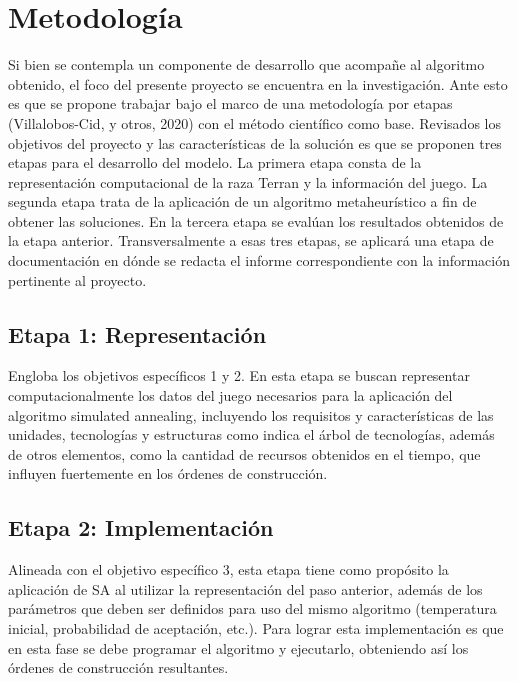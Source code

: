 
\section{Metodología}
Si bien se contempla un componente de desarrollo que acompañe al algoritmo obtenido, el foco del presente proyecto se encuentra en la investigación. Ante esto es que se propone trabajar bajo el marco de una metodología por etapas (Villalobos-Cid, y otros, 2020) con el método científico como base. Revisados los objetivos del proyecto y las características de la solución es que se proponen tres etapas para el desarrollo del modelo. La primera etapa consta de la representación computacional de la raza Terran y la información del juego. La segunda etapa trata de la aplicación de un algoritmo metaheurístico a fin de obtener las soluciones. En la tercera etapa se evalúan los resultados obtenidos de la etapa anterior. Transversalmente a esas tres etapas, se aplicará una etapa de documentación en dónde se redacta el informe correspondiente con la información pertinente al proyecto.

\subsection{Etapa 1: Representaci\'on}

Engloba los objetivos específicos 1 y 2. En esta etapa se buscan representar computacionalmente los datos del juego necesarios para la aplicación del algoritmo simulated annealing, incluyendo los requisitos y características de las unidades, tecnologías y estructuras como indica el árbol de tecnologías, además de otros elementos, como la cantidad de recursos obtenidos en el tiempo, que influyen fuertemente en los órdenes de construcción.

\subsection{Etapa 2: Implementaci\'on}

Alineada con el objetivo específico 3, esta etapa tiene como propósito la aplicación de SA al utilizar la representación del paso anterior, además de los parámetros que deben ser definidos para uso del mismo algoritmo (temperatura inicial, probabilidad de aceptación, etc.). Para lograr esta implementación es que en esta fase se debe programar el algoritmo y ejecutarlo, obteniendo así los órdenes de construcción resultantes.


